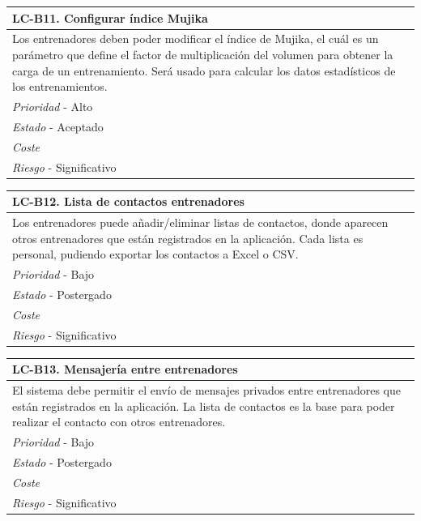 	\begin{center}
		\begin{tabularx}{15cm}{|X|}
			\hline 
				\bf{LC-B11. Configurar índice Mujika}\\
			\hline
				Los entrenadores deben poder modificar el índice de Mujika, el cuál es un parámetro que define el factor de multiplicación del volumen para obtener la carga de un entrenamiento. Será usado para calcular los datos estadísticos de los entrenamientos.\\
			\hline
				{\it Prioridad} - Alto\\
			\hline
				{\it Estado} - Aceptado\\
			\hline
				{\it Coste}\\
			\hline
				{\it Riesgo} - Significativo\\
			\hline
		\end{tabularx}
	\end{center}
	
	\begin{center}
		\begin{tabularx}{15cm}{|X|}
			\hline 
				\bf{LC-B12. Lista de contactos entrenadores}\\
			\hline
				Los entrenadores puede añadir/eliminar listas de contactos, donde aparecen otros entrenadores que están registrados en la aplicación. Cada lista es personal, pudiendo exportar los contactos a Excel o CSV.\\
			\hline
				{\it Prioridad} - Bajo\\
			\hline
				{\it Estado} - Postergado\\
			\hline
				{\it Coste}\\
			\hline
				{\it Riesgo} - Significativo\\
			\hline
		\end{tabularx}
	\end{center}
	
	\begin{center}
		\begin{tabularx}{15cm}{|X|}
			\hline 
				\bf{LC-B13. Mensajería entre entrenadores}\\
			\hline
				El sistema debe permitir el envío de mensajes privados entre entrenadores que están registrados en la aplicación. La lista de contactos es la base para poder realizar el contacto con otros entrenadores.\\
			\hline
				{\it Prioridad} - Bajo\\
			\hline
				{\it Estado} - Postergado\\
			\hline
				{\it Coste}\\
			\hline
				{\it Riesgo} - Significativo\\
			\hline
		\end{tabularx}
	\end{center}

